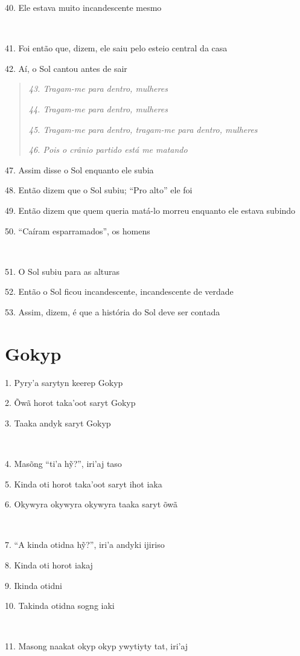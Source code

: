 40. Ele estava muito incandescente mesmo

~

41. Foi então que, dizem, ele saiu pelo esteio central da casa

42. Aí, o Sol cantou antes de sair

\begin{quote}
\forceindent\emph{43. Tragam-me para dentro, mulheres}

\emph{44. Tragam-me para dentro, mulheres}

\emph{45. Tragam-me para dentro, tragam-me para dentro, mulheres}

\emph{46. Pois o crânio partido está me matando}
\end{quote}

47. Assim disse o Sol enquanto ele subia

48. Então dizem que o Sol subiu; ``Pro alto'' ele foi

49. Então dizem que quem queria matá-lo morreu enquanto ele estava subindo

50. ``Caíram esparramados'', os homens

~

51. O Sol subiu para as alturas

52. Então o Sol ficou incandescente, incandescente de verdade

53. Assim, dizem, é que a história do Sol deve ser contada

\chapter*{Gokyp}

1. Pyry'a sarytyn keerep Gokyp

2. Õwã horot taka'oot saryt Gokyp

3. Taaka andyk saryt Gokyp

~

4. Masõng ``ti'a hỹ?'', iri'aj taso

5. Kinda oti horot taka'oot saryt ihot iaka

6. Okywyra okywyra okywyra taaka saryt õwã

~

7. ``A kinda otidna hỹ?'', iri'a andyki ijiriso

8. Kinda oti horot iakaj

9. Ikinda otidni

10. Takinda otidna sogng iaki

~

11. Masong naakat okyp okyp ywytiyty tat, iri'aj

